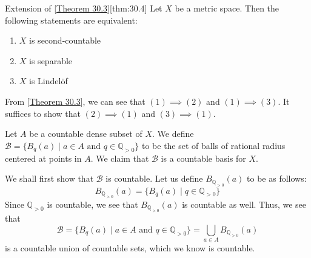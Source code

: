 \begin{thmBox}{Extension of [\hyperlink{thm:30.3}{Theorem 30.3}]}[thm:30.4]
    Let \( X \) be a metric space.
    Then the following statements are equivalent:

    \begin{enumerate}
        \item \( X \) is second-countable
        \item \( X \) is separable
        \item \( X \) is Lindel\"{o}f
    \end{enumerate}

    \baseRule

    \begin{proofBox}
        From [\hyperlink{thm:30.3}{Theorem 30.3}], we can see that 
        \( ( 1 ) \implies ( 2 ) \) and \( ( 1 ) \implies ( 3 ) \).
        It suffices to show that \( ( 2 ) \implies ( 1 ) \) and 
        \( ( 3 ) \implies ( 1 ) \).

        \baseSkip

        Let \( A \) be a countable dense subset of \( X \).
        We define 
        \( 
            \mathcal{B} 
            = 
            \{ B_{ q }( a ) \mid a \in A \text{ and } q \in \mathbb{Q}_{ > 0 } \} 
        \)
        to be the set of balls of rational radius centered at points in \( A \).
        We claim that \( \mathcal{B} \) is a countable basis for \( X \).

        \baseSkip

        We shall first show that \( \mathcal{B} \) is countable. 
        Let us define \( B_{ \mathbb{Q}_{ > 0 } }( a ) \) to be as follows:
        \begin{equation*}
            B_{ \mathbb{Q}_{ > 0 } }( a )
            =
            \{ B_{ q }( a ) \mid q \in \mathbb{Q}_{ > 0 } \}
        \end{equation*}
        Since \( \mathbb{Q}_{ > 0 } \) is countable, we see that 
        \( B_{ \mathbb{Q}_{ > 0 } }( a ) \) is countable as well.
        Thus, we see that 
        \begin{equation*}
            \mathcal{B}
            =
            \{ B_{ q }( a ) \mid a \in A \text{ and } q \in \mathbb{Q}_{ > 0 } \}
            =
            \bigcup_{ a \in A } B_{ \mathbb{Q}_{ > 0 } }( a )
        \end{equation*}
        is a countable union of countable sets, which we know is countable.


\end{proofBox}
\end{thmBox}
